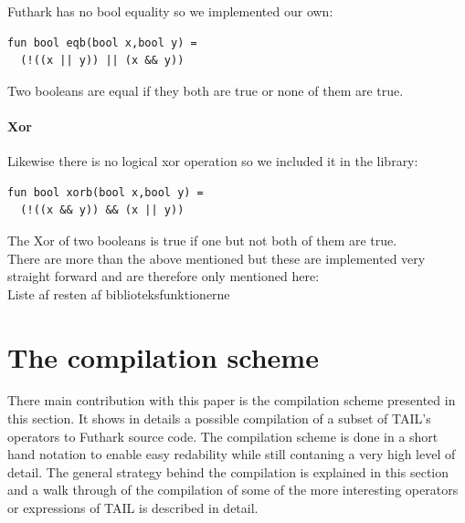 \documentclass[11pt]{article}
\begin{document}
Futhark has no bool equality so we implemented our own:

\begin{lstlisting}[language=Futhark]
fun bool eqb(bool x,bool y) =
  (!((x || y)) || (x && y))
\end{lstlisting}

Two booleans are equal if they both are true or none of them are true.
\paragraph{Xor} Likewise there is no logical xor operation so we included it in the library:

\begin{lstlisting}[language=Futhark]
fun bool xorb(bool x,bool y) =
  (!((x && y)) && (x || y))
\end{lstlisting}

The Xor of two booleans is true if one but not both of them are true.
\\

There are more than the above mentioned but these are implemented very straight forward and are therefore only mentioned here: \\

Liste af resten af biblioteksfunktionerne


\section{The compilation scheme}
\label{sec:scheme}
There main contribution with this paper is the compilation scheme presented in this section. It shows in details a possible  compilation of a subset of TAIL's operators to Futhark source code. The compilation scheme is done in a short hand notation to enable easy redability while still contaning a very high level of detail. The general strategy behind the compilation is explained in this section and a walk through of the compilation of some of the more interesting operators or expressions of TAIL is described in detail. \\
\end{document}
